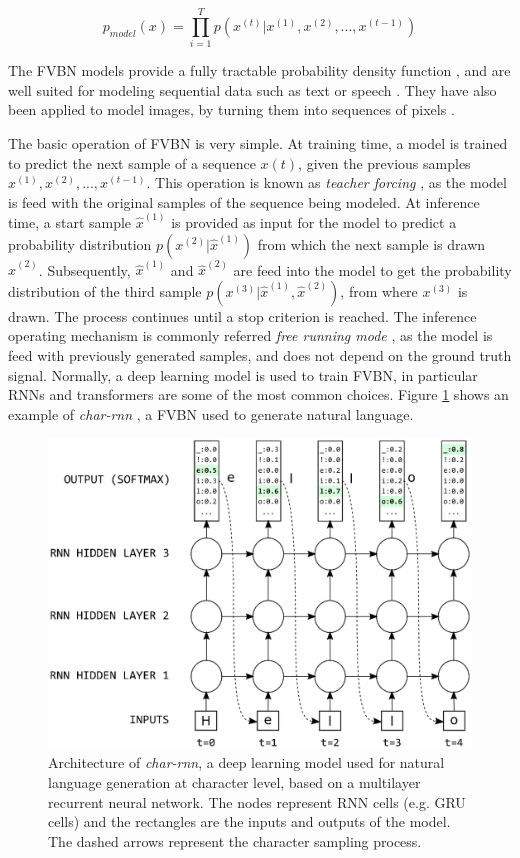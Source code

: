 \begin{equation}
	\label{eq:fvbn}
	p_{model}(x) = \prod_{i=1}^{T} p(x^{(t)}| x^{(1)}, x^{(2)}, ..., x^{(t-1)})
\end{equation}

The FVBN models provide a fully tractable probability density function \autocite{Goodfellow2016}, and are well suited for modeling sequential data such as text or speech \autocite{Wang2017,Shen2018,liu2019b}. They have also been applied to model images, by turning them into sequences of pixels \autocite{Oord2016, Oord2016b}.

The basic operation of FVBN is very simple. At training time, a model is trained to predict the next sample of a sequence $x(t)$, given the previous samples $ x^{(1)}, x^{(2)}, ..., x^{(t-1)}$. This operation is known as \textit{teacher forcing} \autocite{williams1989, Goyal2016, Goodfellow2016}, as the model is feed with the original samples of the sequence being modeled. At inference time, a start sample $\hat{x}^{(1)}$ is provided as input for the model to predict a probability distribution $p(x^{(2)}|\hat{x}^{(1)})$ from which the next sample is drawn $\hat{x}^{(2)}$. Subsequently, $ \hat{x}^{(1)}$ and $\hat{x}^{(2)}$ are feed into the model to get the probability distribution of the third sample $p(x^{(3)}|\hat{x}^{(1)}, \hat{x}^{(2)})$, from where $x^{(3)}$ is drawn. The process continues until a stop criterion is reached. The inference operating mechanism is commonly referred \textit{free running mode} \autocite{Goodfellow2016}, as the model is feed with previously generated samples, and does not depend on the ground truth signal. Normally, a deep learning model is used to train FVBN, in particular RNNs and transformers are some of the most common choices. Figure \ref{fig:charrnn} shows an example of \textit{char-rnn} \autocite{Sutskever2011, Graves2013}, a FVBN used to generate natural language. 

\begin{figure}
	\centering
	\includegraphics[width=0.8\linewidth]{background/images/char_rnn}
	\caption[\textit{Char-rnn} architecture]{Architecture of \textit{char-rnn}, a deep learning model used for natural language generation at character level, based on a multilayer recurrent neural network. The nodes represent RNN cells (e.g. GRU cells) and the rectangles are the inputs and outputs of the model. The dashed arrows represent the character sampling process.}
	\label{fig:charrnn}
\end{figure}


